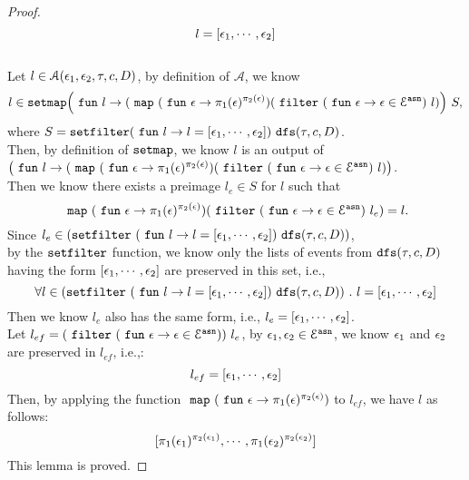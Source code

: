 \begin{proof}





\[
l = [\mathtt{\epsilon}_1, \cdots, \mathtt{\epsilon}_2]
\]
\\
Let  $l \in \mathcal{A}(\mathtt{\epsilon}_1, \mathtt{\epsilon}_2, \mathtt{\tau}, c, D)$,
by definition of $\mathcal{A}$, we know 
%
$$l\in \kw{setmap} 
		\left(\efun l \to ( \emap 
		(\efun  \event \to \pi_1(\event)^{\pi_2(\event)})
	(\efilter 
		(\efun \event \to  \event \in \eventset^{\asn}) ~ l) \right)
	~ S,
$$
%
where $S=\mathtt{setfilter}
		(~\mathtt{fun}~ l \to  l = [\mathtt{\epsilon}_1, \cdots, \mathtt{\epsilon}_2] )~ \mathtt{dfs}(\mathtt{\tau}, c, D)$.
\\
Then, by definition of $\mathtt{setmap}$, we know $l$ is an output of
\\
$\left(\efun l \to ( \emap 
		(\efun  \event \to \pi_1(\event)^{\pi_2(\event)})
	(\efilter 
		(\efun \event \to  \event \in \eventset^{\asn}) ~ l) \right)$.
\\
Then we know there exists a preimage
$l_e \in S $
for $l$ such that 
$$
~\mathtt{map}~ (~\mathtt{fun}~  \mathtt{\epsilon} \to \pi_1(\mathtt{\epsilon})^{\pi_2(\mathtt{\epsilon})}) 
(~\mathtt{filter}~ (~\mathtt{fun}~ \mathtt{\epsilon} \to  \mathtt{\epsilon} \in \mathcal{E}^{\mathtt{{asn}}}) ~ l_e) 
= l.
$$
Since $l_e \in (\mathtt{setfilter} ~(~\mathtt{fun}~ l \to l = [\mathtt{\epsilon}_1, \cdots, \mathtt{\epsilon}_2]) ~ \mathtt{dfs}(\mathtt{\tau}, c, D))$,
\\
by the $\mathtt{setfilter}$ function,
we know only the lists of events from $\mathtt{dfs}(\mathtt{\tau}, c, D)$ having the form
$ [\mathtt{\epsilon}_1, \cdots, \mathtt{\epsilon}_2] $ are preserved in this set, i.e.,
\[
	\forall l \in (\mathtt{setfilter} ~(~\mathtt{fun}~ l \to l = [\mathtt{\epsilon}_1, \cdots, \mathtt{\epsilon}_2]) ~ \mathtt{dfs}(\mathtt{\tau}, c, D))
	~.~ l = [\mathtt{\epsilon}_1, \cdots, \mathtt{\epsilon}_2]
\]
%
Then we know $l_e$ also has the same form, 
i.e., $l_e = [\mathtt{\epsilon}_1, \cdots, \mathtt{\epsilon}_2]$.
%
\\
Let $l_{ef} = (~\mathtt{filter}~ (~\mathtt{fun}~ \mathtt{\epsilon} \to  \mathtt{\epsilon} \in \mathcal{E}^{\mathtt{{asn}}})) ~ l_e$, 
by $\mathtt{\epsilon}_1, \mathtt{\epsilon}_2 \in \mathcal{E}^{\mathtt{{asn}}}$, 
we know $\mathtt{\epsilon}_1$ and $\mathtt{\epsilon}_2$ are preserved in $l_{ef}$, i.e.,:
\[
	l_{ef} =[\mathtt{\epsilon}_1, \cdots, \mathtt{\epsilon}_2]
\]
%
Then, by applying the function
$~\mathtt{map}~ (~\mathtt{fun}~  \mathtt{\epsilon} \to \pi_1(\mathtt{\epsilon})^{\pi_2(\mathtt{\epsilon})})$ to 
$l_{ef}$, we have $l$ as follows:
\[
	[\pi_1(\mathtt{\epsilon}_1)^{\pi_2(\mathtt{\epsilon}_1)}, \cdots, \pi_1(\mathtt{\epsilon}_2)^{\pi_2(\mathtt{\epsilon}_2)}]
\]
%
%
This lemma is proved.
\end{proof}
